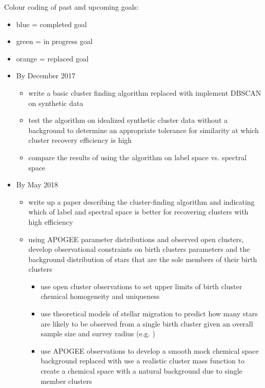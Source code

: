 \documentclass[11pt]{article}
\begin{document}
    Colour coding of past and upcoming goals:
    
    \begin{itemize}
    	\item {\color{RoyalBlue}blue} = completed goal
    	\item {\color{ForestGreen} green} = in progress goal
    	\item {\color{BurntOrange} orange} = replaced goal
    \end{itemize}
    
    
    \begin{itemize}
		\item By December 2017
		\begin{itemize} 
		\item {\color{BurntOrange} write a basic cluster finding algorithm} replaced with {\color{RoyalBlue} implement DBSCAN on synthetic data}
		\item {\color{RoyalBlue} test the algorithm on idealized synthetic cluster data without a background to determine an appropriate tolerance for similarity at which cluster recovery efficiency is high}
		\item {\color{RoyalBlue} compare the results of using the algorithm on label space vs. spectral space}
		\end{itemize}
		\item By May 2018
		\begin{itemize}
		\item {\color{ForestGreen} write up a paper describing the cluster-finding algorithm and indicating which of label and spectral space is better for recovering clusters with high efficiency}
		\item {\color{RoyalBlue}using APOGEE parameter distributions and observed open clusters, develop observational constraints on birth clusters parameters and the background distribution of stars that are the sole members of their birth clusters}
		\begin{itemize}
		\item {\color{ForestGreen} use open cluster observations to set upper limits of birth cluster chemical homogeneity and uniqueness}
		\item use theoretical models of stellar migration to predict how many stars are likely to be observed from a single birth cluster given an overall sample size and survey radius (e.g. \citealt{Ting2015a})
		\item {\color{BurntOrange} use APOGEE observations to develop a smooth mock chemical space background} replaced with {\color{RoyalBlue} use a realistic cluster mass function to create a chemical space with a natural background due to single member clusters}

\end{itemize}
\end{itemize}
\end{itemize}
\end{document}
